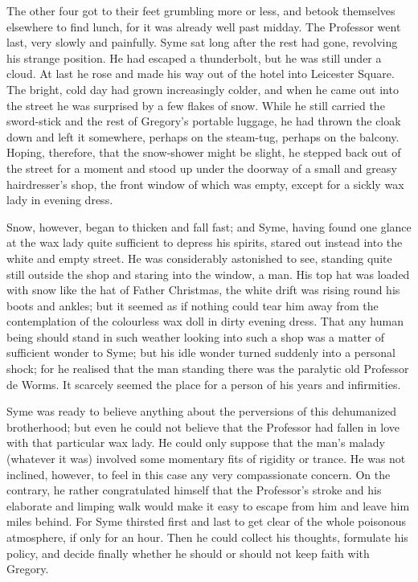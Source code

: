 The other four got to their feet grumbling more or less, and betook themselves elsewhere to find lunch, for it was already well past midday. The Professor went last, very slowly and painfully. Syme sat long after the rest had gone, revolving his strange position. He had escaped a thunderbolt, but he was still under a cloud. At last he rose and made his way out of the hotel into Leicester Square. The bright, cold day had grown increasingly colder, and when he came out into the street he was surprised by a few flakes of snow. While he still carried the sword-stick and the rest of Gregory’s portable luggage, he had thrown the cloak down and left it somewhere, perhaps on the steam-tug, perhaps on the balcony. Hoping, therefore, that the snow-shower might be slight, he stepped back out of the street for a moment and stood up under the doorway of a small and greasy hairdresser’s shop, the front window of which was empty, except for a sickly wax lady in evening dress.

Snow, however, began to thicken and fall fast; and Syme, having found one glance at the wax lady quite sufficient to depress his spirits, stared out instead into the white and empty street. He was considerably astonished to see, standing quite still outside the shop and staring into the window, a man. His top hat was loaded with snow like the hat of Father Christmas, the white drift was rising round his boots and ankles; but it seemed as if nothing could tear him away from the contemplation of the colourless wax doll in dirty evening dress. That any human being should stand in such weather looking into such a shop was a matter of sufficient wonder to Syme; but his idle wonder turned suddenly into a personal shock; for he realised that the man standing there was the paralytic old Professor de Worms. It scarcely seemed the place for a person of his years and infirmities.

Syme was ready to believe anything about the perversions of this dehumanized brotherhood; but even he could not believe that the Professor had fallen in love with that particular wax lady. He could only suppose that the man’s malady (whatever it was) involved some momentary fits of rigidity or trance. He was not inclined, however, to feel in this case any very compassionate concern. On the contrary, he rather congratulated himself that the Professor’s stroke and his elaborate and limping walk would make it easy to escape from him and leave him miles behind. For Syme thirsted first and last to get clear of the whole poisonous atmosphere, if only for an hour. Then he could collect his thoughts, formulate his policy, and decide finally whether he should or should not keep faith with Gregory.

